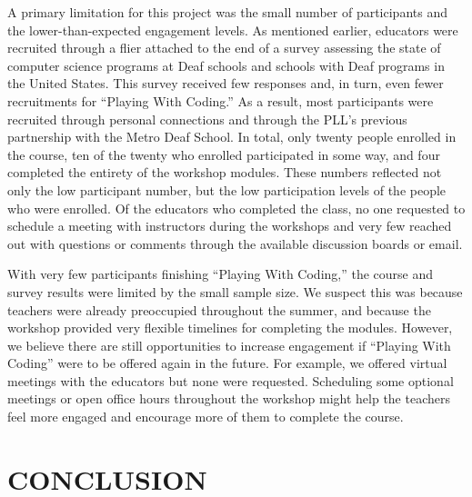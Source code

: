 \documentclass[11.5pt]{sig-alternate} %
\begin{document}
\begin{large}
A primary limitation for this project was the small number of participants and the lower-than-expected engagement levels. As mentioned earlier, educators were recruited through a flier attached to the end of a survey assessing the state of computer science programs at Deaf schools and schools with Deaf programs in the United States. This survey received few responses and, in turn, even fewer recruitments for “Playing With Coding.” As a result, most participants were recruited through personal connections and through the PLL’s previous partnership with the Metro Deaf School. In total, only twenty people enrolled in the course, ten of the twenty who enrolled participated in some way, and four completed the entirety of the workshop modules. These numbers reflected not only the low participant number, but the low participation levels of the people who were enrolled. Of the educators who completed the class, no one requested to schedule a meeting with instructors during the workshops and very few reached out with questions or comments through the available discussion boards or email.

With very few participants finishing “Playing With Coding,” the course and survey results were limited by the small sample size. We suspect this was because teachers were already preoccupied throughout the summer, and because the workshop provided very flexible timelines for completing the modules. However, we believe there are still opportunities to increase engagement if “Playing With Coding” were to be offered again in the future. For example, we offered virtual meetings with the educators but none were requested. Scheduling some optional meetings or open office hours throughout the workshop might help the teachers feel more engaged and encourage more of them to complete the course.

\section*{CONCLUSION}


\end{large}
\end{document}
